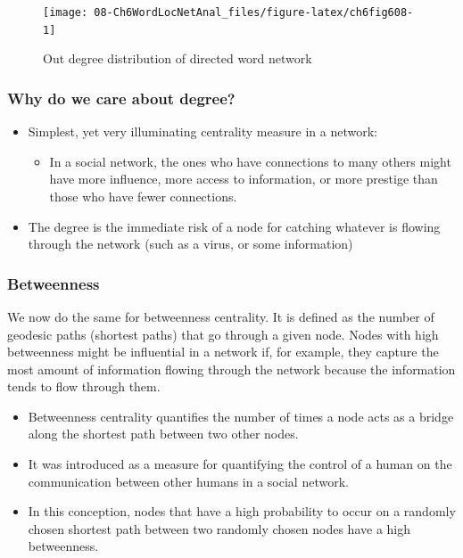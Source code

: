\documentclass[
]{article}
\providecommand{\tightlist}{%
  \setlength{\itemsep}{0pt}\setlength{\parskip}{0pt}}
\begin{document}
\begin{figure}

{\centering \texttt{[image: 08-Ch6WordLocNetAnal\_files/figure-latex/ch6fig608-1]} 

}

\caption{Out degree distribution of directed word network}\label{fig:ch6fig608}
\end{figure}

\hypertarget{why-do-we-care-about-degree}{%
\subsubsection{Why do we care about degree?}\label{why-do-we-care-about-degree}}

\begin{itemize}
\tightlist
\item
  Simplest, yet very illuminating centrality measure in a network:

  \begin{itemize}
  \tightlist
  \item
    In a social network, the ones who have connections to many others might have more influence, more access to information, or more prestige than those who have fewer connections.
  \end{itemize}
\item
  The degree is the immediate risk of a node for catching whatever is flowing through the network (such as a virus, or some information)
\end{itemize}

\hypertarget{betweenness}{%
\subsubsection{Betweenness}\label{betweenness}}

We now do the same for betweenness centrality. It is defined as the number of geodesic paths (shortest paths) that go through a given node. Nodes with high betweenness might be influential in a network if, for example, they capture the most amount of information flowing through the network because the information tends to flow through them.

\begin{itemize}
\tightlist
\item
  Betweenness centrality quantifies the number of times a node acts as a bridge along the shortest path between two other nodes.
\item
  It was introduced as a measure for quantifying the control of a human on the communication between other humans in a social network.
\item
  In this conception, nodes that have a high probability to occur on a randomly chosen shortest path between two randomly chosen nodes have a high betweenness.
\end{itemize}
\end{document}
